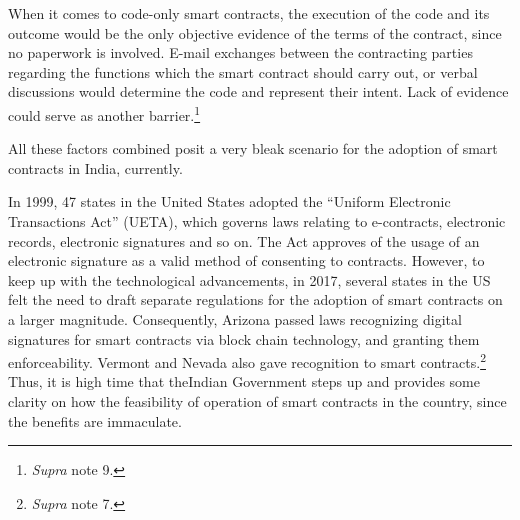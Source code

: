 \begin{multicols}{2}
\vspace{-.1cm}

\noi
When it comes to code-only smart contracts, the execution of the code and its outcome would
be the only objective evidence of the terms of the contract, since no paperwork is involved.
E-mail exchanges between the contracting parties regarding the functions which the smart
contract should carry out, or verbal discussions would determine the code and represent their
intent. Lack of evidence could serve as another barrier.\footnote{\textit{Supra} note 9.}

\vspace{-.1cm}

\noi
All these factors combined posit a very bleak scenario for the adoption of smart contracts in
India, currently. 

\vspace{-.1cm}


\vspace{-.1cm}

\noi
In 1999, 47 states in the United States adopted the “Uniform Electronic Transactions Act”
(UETA), which governs laws relating to e-contracts, electronic records, electronic signatures
and so on. The Act approves of the usage of an electronic signature as a valid method of
consenting to contracts. However, to keep up with the technological advancements, in 2017,
several states in the US felt the need to draft separate regulations for the adoption of smart
contracts on a larger magnitude. Consequently, Arizona passed laws recognizing digital
signatures for smart contracts via block chain technology, and granting them enforceability.
Vermont and Nevada also gave recognition to smart contracts.\footnote{\textit{Supra} note 7.} Thus, it is high time that the\break Indian Government steps up and provides some clarity on how the feasibility of operation of
smart contracts in the country, since the benefits are immaculate. 

\vspace{-.1cm}


\vspace{-.1cm}


\end{multicols}
